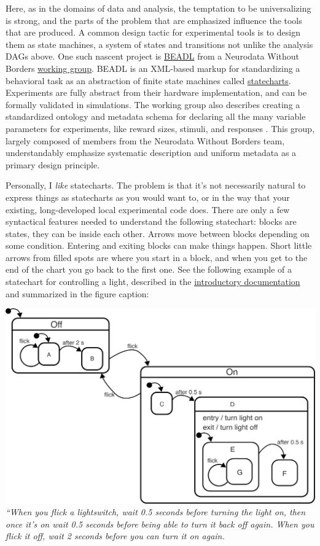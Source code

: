 \documentclass[10pt]{article}
\begin{document}
\begin{multicols}{2}
Here, as in the domains of data and analysis, the temptation to be
universalizing is strong, and the parts of the problem that are
emphasized influence the tools that are produced. A common design tactic
for experimental tools is to design them as state machines, a system of
states and transitions not unlike the analysis DAGs above. One such
nascent project is
\href{https://archive.org/details/beadl-xml-documentation-v-0.1/mode/2up}{BEADL}
\cite{wulfBEADLXMLDocumentation2020}  from a Neurodata Without
Borders
\href{https://archive.org/details/nwb-behavioral-task-wg}{working
group}. BEADL is an XML-based markup for standardizing a behavioral task
as an abstraction of finite state machines called
\href{https://statecharts.github.io/}{statecharts}. Experiments are
fully abstract from their hardware implementation, and can be formally
validated in simulations. The working group also describes creating a
standardized ontology and metadata schema for declaring all the many
variable parameters for experiments, like reward sizes, stimuli, and
responses \cite{nwbbehavioraltaskwgNWBBehavioralTask2020} . This
group, largely composed of members from the Neurodata Without Borders
team, understandably emphasize systematic description and uniform
metadata as a primary design principle.

Personally, I \emph{like} statecharts. The problem is that it's not
necessarily natural to express things as statecharts as you would want
to, or in the way that your existing, long-developed local experimental
code does. There are only a few syntactical features needed to
understand the following statechart: blocks are states, they can be
inside each other. Arrows move between blocks depending on some
condition. Entering and exiting blocks can make things happen. Short
little arrows from filled spots are where you start in a block, and when
you get to the end of the chart you go back to the first one. See the
following example of a statechart for controlling a light, described in
the \href{https://statecharts.dev/on-off-statechart.html}{introductory
documentation} and summarized in the figure caption:

\includegraphics[width=\linewidth]{../assets/images/on-off-delayed-exit-1.png}
\emph{``When you flick a lightswitch, wait 0.5 seconds before turning
the light on, then once it's on wait 0.5 seconds before being able to
turn it back off again. When you flick it off, wait 2 seconds before you
can turn it on again.}


\end{multicols}
\end{document}
